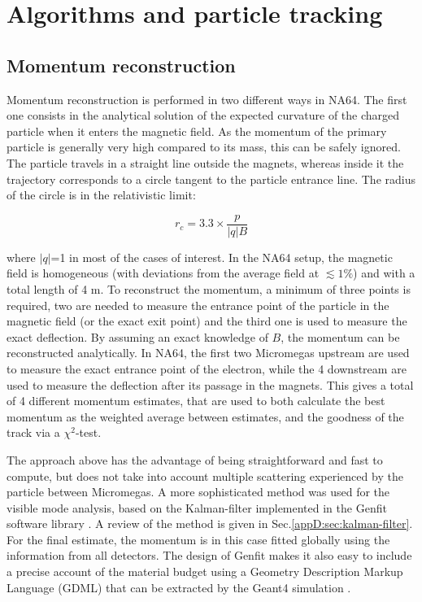 
\newcommand{\appdird}{appendices/plots/appendixD}

\chapter{Algorithms and particle tracking}

\label{AppendixD}


\section{Momentum reconstruction}
\label{appD:sec:mom-reco}

Momentum reconstruction is performed in two different ways in NA64. The first one consists in the analytical solution of the expected curvature of the charged particle when it enters the magnetic field. As the momentum of the primary particle is generally very high compared to its mass, this can be safely ignored. The particle travels in a straight line outside the magnets, whereas inside it the trajectory corresponds to a circle tangent to the particle entrance line. The radius of the circle is in the relativistic limit:

\begin{equation}
  \label{eq:gyro-radius}
  r_c = 3.3 \times \frac{p}{\left|q\right|B}
\end{equation}

where $\left|q\right|$=1 in most of the cases of interest. In the NA64 setup, the magnetic field is homogeneous (with deviations from the average field at $\lesssim 1\%$) and with a total length of 4 \si{\meter}. To reconstruct the momentum, a minimum of three points is required, two are needed to measure the entrance point of the particle in the magnetic field (or the exact exit point) and the third one is used to measure the exact deflection. By assuming an exact knowledge of $B$, the momentum can be reconstructed analytically. In NA64, the first two Micromegas upstream are used to measure the exact entrance point of the electron, while the 4 downstream are used to measure the deflection after its passage in the magnets. This gives a total of 4 different momentum estimates, that are used to both calculate the best momentum as the weighted average between estimates, and the goodness of the track via a $\chi^2$-test.

The approach above has the advantage of being straightforward and fast to compute, but does not take into account multiple scattering experienced by the particle between Micromegas. A more sophisticated method was used for the visible mode analysis, based on the Kalman-filter implemented in the Genfit software library \cite{genfit}. A review of the method is given in Sec.\ref{appD:sec:kalman-filter}. For the final estimate, the momentum is in this case fitted globally using the information from all detectors. The design of Genfit makes it also easy to include a precise account of the material budget using a Geometry Description Markup Language (GDML) that can be extracted by the Geant4 simulation \cite{gdml}.

